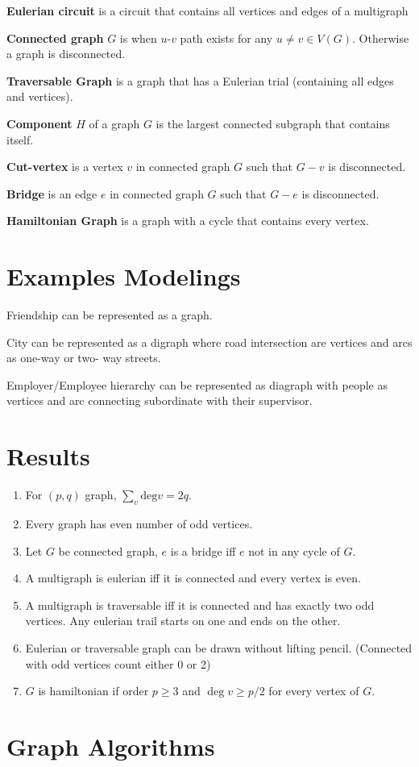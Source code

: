 \documentclass[12pt]{article}
\begin{document}
\textbf{Eulerian circuit} is a circuit that contains all vertices and edges of a multigraph

\textbf{Connected graph} $G$ is when $u$-$v$ path exists for any $u\neq v \in V(G)$. Otherwise a graph is disconnected.

\textbf{Traversable Graph} is a graph that has a Eulerian trial (containing all edges and vertices).

\textbf{Component} $H$ of a graph $G$ is the largest connected subgraph that contains itself. 

\textbf{Cut-vertex} is a vertex $v$ in connected graph $G$ such that $G - v$ is disconnected.

\textbf{Bridge} is an edge $e$ in connected graph $G$ such that $G - e$ is disconnected.

\textbf{Hamiltonian Graph} is a graph with a cycle that contains every vertex.


\section{Examples Modelings}
Friendship can be represented as a graph.

City can be represented as a digraph where road intersection are vertices and arcs as one-way or two- way streets.

Employer/Employee hierarchy can be represented as diagraph with people as vertices and arc connecting subordinate with their supervisor.  

\section{Results}
\begin{enumerate}[wide, labelwidth=!, labelindent=0pt]
	\item For $(p,q)$ graph, $\sum_v \text{deg} v = 2 q$.
	\item Every graph has even number of odd vertices.
	\item Let $G$ be connected graph, $e$ is a bridge iff $e$ not in any cycle of $G$.
	\item A multigraph is eulerian iff it is connected and every vertex is even.
	\item A multigraph is traversable iff it is connected and has exactly two odd vertices. Any eulerian trail starts on one and ends on the other.
	\item Eulerian or traversable graph can be drawn without lifting pencil. (Connected with odd vertices count either 0 or 2)
	\item $G$ is hamiltonian if order $p \geq 3$ and $\deg v \geq p/ 2$ for every vertex of $G$.
\end{enumerate}

\section{Graph Algorithms}
\end{document}
